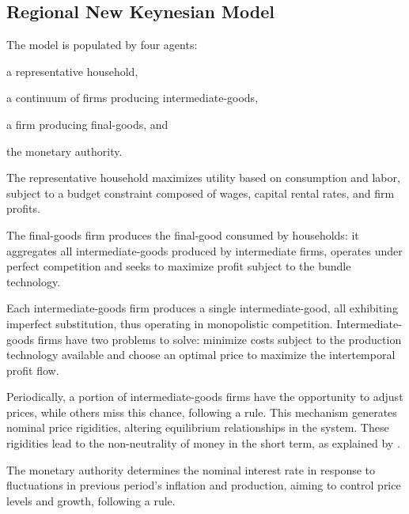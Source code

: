 \documentclass[../thesis.tex]{subfiles}
\begin{document}


\subsection{Regional New Keynesian Model}\label{sec_v6:nk-model}

	The model is populated by four agents: 
	\begin{enumerate*}[label=(\arabic*)]
	\item a representative household,
	\item a continuum of firms producing intermediate-goods,
	\item a firm producing final-goods, and
	\item the monetary authority.
	\end{enumerate*}

	The representative household maximizes utility based on consumption and labor, subject to a budget constraint composed of wages, capital rental rates, and firm profits.
	
	The final-goods firm produces the final-good consumed by households: it aggregates all intermediate-goods produced by intermediate firms, operates under perfect competition and seeks to maximize profit subject to the bundle technology.
	
	Each intermediate-goods firm produces a single intermediate-good, all exhibiting imperfect substitution, thus operating in monopolistic competition. Intermediate-goods firms have two problems to solve: minimize costs subject to the production technology available and choose an optimal price to maximize the intertemporal profit flow.
	
	Periodically, a portion of intermediate-goods firms have the opportunity to adjust prices, while others miss this chance, following a \textcite{calvo_staggered_1983} rule. This mechanism generates nominal price rigidities, altering equilibrium relationships in the system. These rigidities lead to the non-neutrality of money in the short term, as explained by \textcite[p.191]{costa_junior_understanding_2016}.
	
	The monetary authority determines the nominal interest rate in response to fluctuations in previous period's inflation and production, aiming to control price levels and growth, following a \textcite{taylor_discretion_1993} rule.
	
\end{document}
